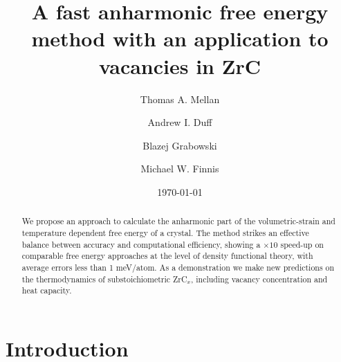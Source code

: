 \documentclass[twocolumn,american,aps,prb,showpacs,showkeys,amsmath,amssymb,superscriptaddress,a4]{revtex4-1}
\begin{document}
%

\title{A fast anharmonic free energy method with an application to vacancies
in ZrC}

\author{Thomas A. Mellan}

\author{Andrew I. Duff}


\author{Blazej Grabowski}


\author{Michael W. Finnis}


\date{\today}

%
\begin{abstract}
We propose an approach to calculate the anharmonic part of the volumetric-strain
and temperature dependent free energy of a crystal. The method strikes
an effective balance between accuracy and computational efficiency,
showing a $\times10$ speed-up on comparable free energy approaches at the level of density functional theory,
with average errors less than 1 meV/atom. As a demonstration
we make new predictions on the thermodynamics of substoichiometric
ZrC$_x$, including vacancy concentration and heat capacity.
\end{abstract}

\maketitle

\section{Introduction \label{sec:Introduction}}
\end{document}
